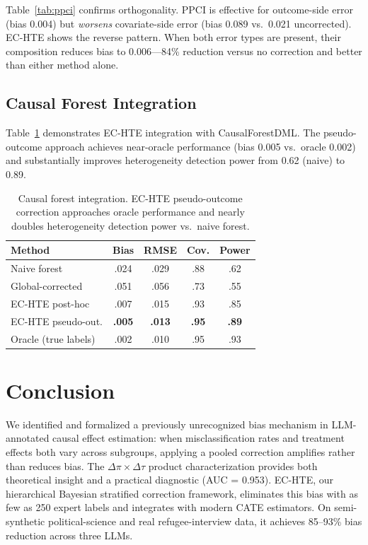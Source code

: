 \documentclass[11pt,a4paper]{article}
\begin{document}
Table~\ref{tab:ppci} confirms orthogonality. PPCI is effective for outcome-side error (bias 0.004) but \emph{worsens} covariate-side error (bias 0.089 vs.\ 0.021 uncorrected). EC-HTE shows the reverse pattern. When both error types are present, their composition reduces bias to 0.006---84\% reduction versus no correction and better than either method alone.

\subsection{Causal Forest Integration}

Table~\ref{tab:forest} demonstrates EC-HTE integration with CausalForestDML. The pseudo-outcome approach achieves near-oracle performance (bias 0.005 vs.\ oracle 0.002) and substantially improves heterogeneity detection power from 0.62 (naive) to 0.89.

\begin{table}[t]
\centering
\small
\setlength{\tabcolsep}{3.5pt}
\begin{tabular}{lcccc}
\toprule
Method & Bias & RMSE & Cov. & Power \\
\midrule
Naive forest & .024 & .029 & .88 & .62 \\
Global-corrected & .051 & .056 & .73 & .55 \\
EC-HTE post-hoc & .007 & .015 & .93 & .85 \\
EC-HTE pseudo-out. & \textbf{.005} & \textbf{.013} & \textbf{.95} & \textbf{.89} \\
Oracle (true labels) & .002 & .010 & .95 & .93 \\
\bottomrule
\end{tabular}
\caption{Causal forest integration. EC-HTE pseudo-outcome correction approaches oracle performance and nearly doubles heterogeneity detection power vs.\ naive forest.}
\label{tab:forest}
\end{table}

\section{Conclusion}

We identified and formalized a previously unrecognized bias mechanism in LLM-annotated causal effect estimation: when misclassification rates and treatment effects both vary across subgroups, applying a pooled correction amplifies rather than reduces bias. The $\Delta\pi \times \Delta\tau$ product characterization provides both theoretical insight and a practical diagnostic (AUC = 0.953). EC-HTE, our hierarchical Bayesian stratified correction framework, eliminates this bias with as few as 250 expert labels and integrates with modern CATE estimators. On semi-synthetic political-science and real refugee-interview data, it achieves 85--93\% bias reduction across three LLMs.
\end{document}
